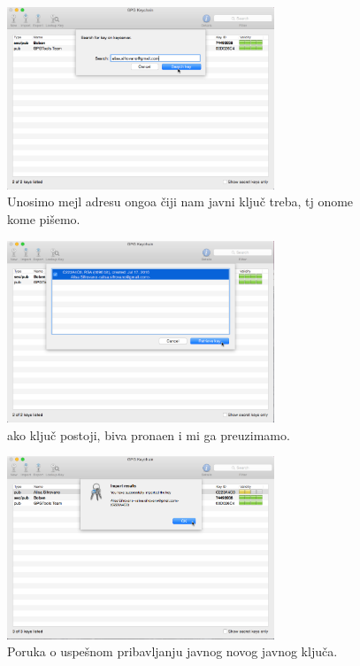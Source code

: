 \documentclass[a4paper,11pt]{article}
\begin{document}
\begin{figure}[!h]
	\begin{center}
		\includegraphics[width=8cm]{19_Oracle_VM_VirtualBox.png}
		\caption{Unosimo mejl adresu ongoa \v{c}iji nam javni klju\v{c} treba, tj onome kome pi\v{s}emo.}
		\label{gpgtools_email_setup9}
	\end{center}
\end{figure}
\newpage
\begin{figure}[!h]
	\begin{center}
		\includegraphics[width=8cm]{20_Oracle_VM_VirtualBox.png}
		\caption{ako klju\v{c} postoji, biva prona\dj{}en i mi ga preuzimamo.}
		\label{gpgtools_email_setup10}
	\end{center}
\end{figure}
\begin{figure}[!h]
	\begin{center}
		\includegraphics[width=8cm]{21_Oracle_VM_VirtualBox.png}
		\caption{Poruka o uspe\v{s}nom pribavljanju javnog novog javnog klju\v{c}a.}
		\label{gpgtools_email_setup11}
	\end{center}
\end{figure}
\end{document}
